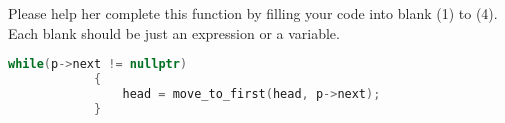 \begin{parts}
    Please help her complete this function by filling your code into blank (1) to (4). Each blank should be just an expression or a variable.

    \begin{solution}
        \begin{lstlisting}[language=C++]
            while(p->next != nullptr)
            {
                head = move_to_first(head, p->next);
            }
        \end{lstlisting}
    \end{solution}



\end{parts}
